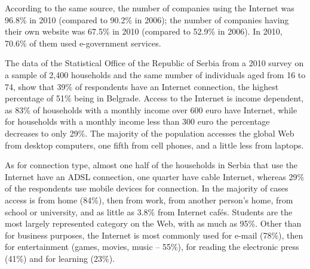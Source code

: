 \begin{multicols}{2}

According to the same source, the number of companies using the Internet was 96.8\% in 2010 (compared to 90.2\% in 2006); the number of companies having their own website was 67.5\% in 2010 (compared to 52.9\% in 2006).  In 2010, 70.6\% of them used e-government services. 

The data of the Statistical Office of the Republic of Serbia from a 2010 survey on a sample of 2,400 households and the same number of individuals aged from 16 to 74, show that 39\% of respondents have an Internet connection, the highest percentage of 51\% being in Belgrade. \cite{ICT2010} Access to the Internet is income dependent, as 83\% of households with a monthly income over 600 euro have Internet, while for households with a monthly income less than 300 euro the percentage decreases to only 29\%. The majority of the population accesses the global Web from desktop computers, one fifth from cell phones, and a little less from laptops. 

As for connection type, almost one half of the households in Serbia that use the Internet have an ADSL connection, one quarter have cable Internet, whereas 29\% of the respondents use mobile devices for connection. In the majority of cases access is from home (84\%), then from work, from another person’s home, from school or university, and as little as 3.8\% from Internet caf\'es. Students are the most largely represented category on the Web, with as much as 95\%. Other than for business purposes, the Internet is most commonly used for e-mail (78\%), then for entertainment (games, movies, music – 55\%), for reading the electronic press (41\%) and for learning (23\%). 


\end{multicols}
